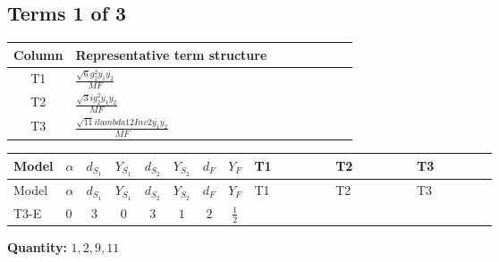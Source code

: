 \documentclass[8pt]{article}
\begin{document}
\begin{landscape}
\subsection*{Terms 1 of 3}
\begin{center}
\begin{tabular}{@{}c >{\raggedright\arraybackslash}p{0.82\linewidth}@{}}
\toprule
Column & Representative term structure \\
\midrule
T1 & \(\displaystyle \frac{\sqrt{6} g_{2}^{2} \overline{y_{1}} \overline{y_{2}}}{MF}\) \\
\midrule
T2 & \(\displaystyle \frac{\sqrt{3} i g_{2}^{2} \overline{y_{1}} \overline{y_{2}}}{MF}\) \\
\midrule
T3 & \(\displaystyle \frac{\sqrt{11} i lambda12Inv2 \overline{y_{1}} \overline{y_{2}}}{MF}\) \\
\midrule
\bottomrule
\end{tabular}
\end{center}
\smallskip
\tiny
\begin{longtable}{@{}llcccccc >{\raggedright\arraybackslash}p{0.21\linewidth} >{\raggedright\arraybackslash}p{0.21\linewidth} >{\raggedright\arraybackslash}p{0.21\linewidth}@{}}
\toprule
Model & $\alpha$ & $d_{S_1}$ & $Y_{S_1}$ & $d_{S_2}$ & $Y_{S_2}$ & $d_F$ & $Y_F$ & T1 & T2 & T3 \\
\midrule
\endfirsthead
\toprule
Model & $\alpha$ & $d_{S_1}$ & $Y_{S_1}$ & $d_{S_2}$ & $Y_{S_2}$ & $d_F$ & $Y_F$ & T1 & T2 & T3 \\
\midrule
\endhead
T3-E & $0$ & $3$ & $0$ & $3$ & $1$ & $2$ & $\frac{1}{2}$ & \scriptsize\adjustbox{max width=\linewidth}{$\begin{gathered} - \frac{\sqrt{6} g_{2}^{2} \overline{y_{1}} \overline{y_{2}}}{6 MF}\end{gathered}$} & \scriptsize\adjustbox{max width=\linewidth}{$\begin{gathered} - \frac{15 \sqrt{3} i g_{2}^{2} \overline{y_{1}} \overline{y_{2}}}{8 MF}\end{gathered}$} & \scriptsize\adjustbox{max width=\linewidth}{$\begin{gathered} - \frac{3 \sqrt{11} i lambda12Inv2 \overline{y_{1}} \overline{y_{2}}}{22 MF}\end{gathered}$} \\
\midrule
\bottomrule
\end{longtable}
\clearpage
\noindent\textbf{Quantity: }$\mathrm{1,2,9,11}$\par\smallskip

\end{landscape}
\end{document}
